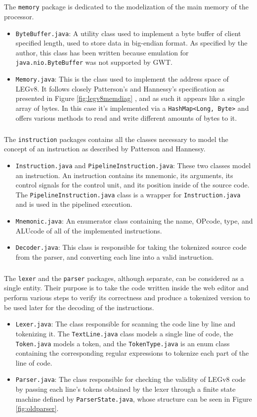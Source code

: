\subparagraph{}
The \verb|memory| package is dedicated to the modelization of the main memory of the processor.
\begin{itemize}
\item \verb|ByteBuffer.java|:  A utility class used to implement a byte buffer of client specified length, used to store data in big-endian format. As specified by the author, this class has been written because emulation for \verb|java.nio.ByteBuffer| was not supported by GWT.
\item \verb|Memory.java|:  This is the class used to implement the address space of LEGv8. It follows closely Patterson's and Hannessy's specification as presented in Figure \ref{fig:legv8memdiag} , and as such it appears like a single array of bytes. In this case it's implemented via a \verb|HashMap<Long, Byte>| and offers various methods to read and write different amounts of bytes to it.
\end{itemize}
\subparagraph{}
The \verb|instruction| packages contains all the classes necessary to model the concept of an instruction as described by Patterson and Hannessy.
\begin{itemize}
	\item \verb|Instruction.java| and \verb|PipelineInstruction.java|: These two classes model an instruction. An instruction contains its mnemonic, its arguments, its control signals for the control unit, and its position inside of the source code. The \verb|PipelineInstruction.java| class is a wrapper for \verb|Instruction.java| and is used in the pipelined execution.
	\item \verb|Mnemonic.java|: An enumerator class containing the name, OPcode, type, and ALUcode of all of the implemented instructions.
	\item \verb|Decoder.java|: This class is responsible for taking the tokenized source code from the parser, and converting each line into a valid instruction. 
\end{itemize}
\subparagraph{}
The \verb|lexer| and the \verb|parser| packages, although separate, can be considered as a single entity. Their purpose is to take the code written inside the web editor and perform various steps to verify its correctness and produce a tokenized version to be used later for the decoding of the instructions.
\begin{itemize}
    \item \verb|Lexer.java|: The class responsible for scanning the code line by line and tokenizing it. The \verb|TextLine.java| class models a single line of code, the \verb|Token.java| models a token, and the \verb|TokenType.java| is an enum class containing the corresponding regular expressions to tokenize each part of the line of code.
    \item \verb|Parser.java|: The class responsible for checking the validity of LEGv8 code by passing each line's tokens obtained by the lexer through a finite state machine defined by \verb|ParserState.java|, whose structure can be seen in Figure \ref{fig:oldparser}.
\end{itemize}
